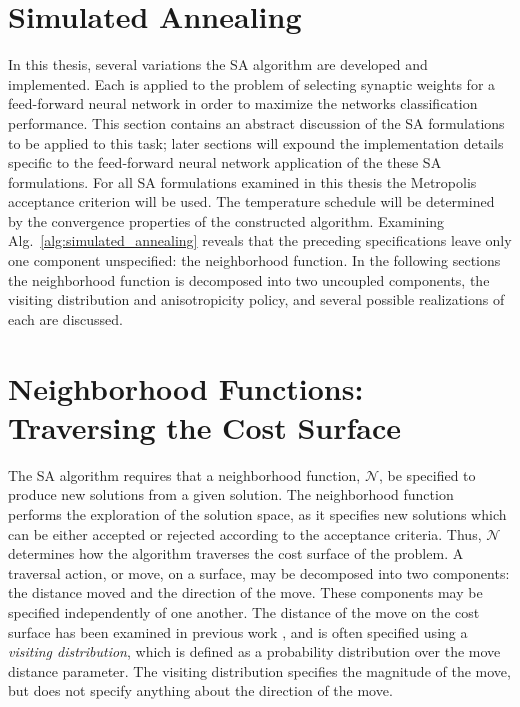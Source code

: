 \documentclass[11pt]{afthesis}
\begin{document}
	\section{Simulated Annealing}
	\label{scn:simulated_annealing}
	
	In this thesis, several variations the SA algorithm are developed and implemented. Each is applied to the problem of selecting synaptic weights for a feed-forward neural network in order to maximize the networks classification performance. This section contains an abstract discussion of the SA formulations to be applied to this task; later sections will expound the implementation details specific to the feed-forward neural network application of the these SA formulations. For all SA formulations examined in this thesis the Metropolis acceptance criterion will be used. The temperature schedule will be determined by the convergence properties of the constructed algorithm. Examining Alg.~\ref{alg:simulated_annealing} reveals that the preceding specifications leave only one component unspecified: the neighborhood function. In the following sections the neighborhood function is decomposed into two uncoupled components, the visiting distribution and anisotropicity policy, and several possible realizations of each are discussed.
	
	\section{Neighborhood Functions: Traversing the Cost Surface}
	
	The SA algorithm requires that a neighborhood function, \begin{math} \mathcal{N} \end{math}, be specified to produce new solutions from a given solution. The neighborhood function performs the exploration of the solution space, as it specifies new solutions which can be either accepted or rejected according to the acceptance criteria. Thus, \begin{math} \mathcal{N} \end{math} determines how the algorithm traverses the cost surface of the problem. A traversal action, or move, on a surface, may be decomposed into two components: the distance moved and the direction of the move. These components may be specified independently of one another. The distance of the move on the cost surface has been examined in previous work \cite{szu1987fastsimulatedannealing,tsallis1996generalizedsimulatedannealing,ingber1989veryfastsimulatedreannealing}, and is often specified using a \textit{visiting distribution}, which is defined as a probability distribution over the move distance parameter. The visiting distribution specifies the magnitude of the move, but does not specify anything about the direction of the move. 
	
\end{document}
